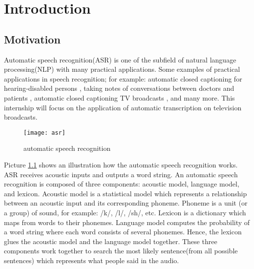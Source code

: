 \chapter{Introduction}


\section{Motivation}
Automatic speech recognition(ASR) is one of the subfield of natural language processing(NLP) with many practical applications. Some examples of practical applications in speech recognition; for example: automatic closed captioning for hearing-disabled persons \cite{Patel2010}, taking notes of conversations between doctors and patients \cite{Klann2008}, automatic closed captioning TV broadcasts \cite{Woodland2015}, and many more.
This internship will focus on the application of automatic transcription on television broadcasts.

\begin{figure}[H]
\caption{automatic speech recognition}
\texttt{[image: asr]}
\label{AutomaticSpeechRecognition}
\centering
\end{figure}

Picture \ref{AutomaticSpeechRecognition} shows an illustration how the automatic speech recognition works. ASR receives acoustic inputs and outputs a word string. An automatic speech recognition is composed of three components: acoustic model, language model, and lexicon. Acoustic model is a statistical model which represents a relationship between an acoustic input and its corresponding phoneme. Phoneme is a unit (or a group) of sound, for example: /k/, /l/, /sh/, etc. Lexicon is a dictionary which maps from words to their phonemes.  Language model computes the probability of a word string where each word consists of several phonemes. Hence, the lexicon glues the acoustic model and the language model together.  These three components work together to  search the most likely sentence(from all possible sentences) which represents what people said in the audio. 


